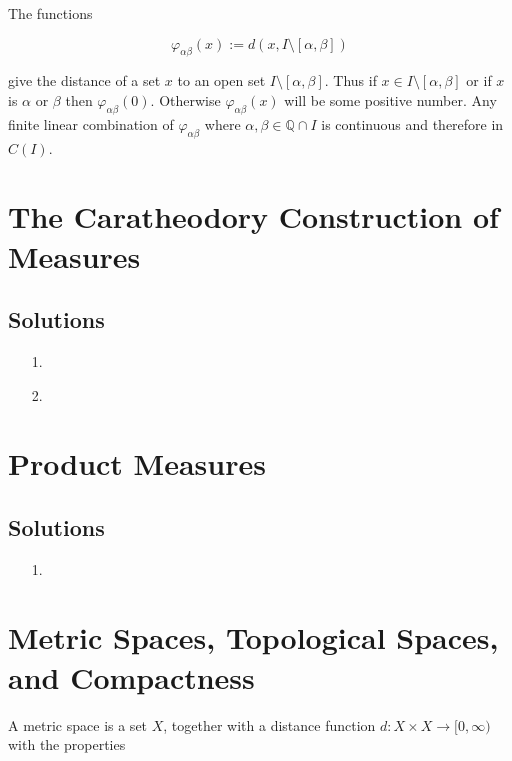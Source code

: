 \documentclass[oneside]{book}
\begin{document}
\begin{enumerate}
The functions

\begin{equation}
\varphi_{\alpha \beta}(x) := d(x, I \setminus [\alpha, \beta])
\end{equation} 

give the distance of a set $x$ to an open set $I \setminus [\alpha,\beta]$. Thus if $x \in I \setminus [\alpha,\beta]$ or if $x$ is $\alpha$ or $\beta$ then $\varphi_{\alpha \beta}(0)$. Otherwise $\varphi_{\alpha \beta}(x)$ will be some positive number. Any finite linear combination of $\varphi_{\alpha \beta}$ where $\alpha,\beta \in \mathbb{Q} \cap I$ is continuous and therefore in $C(I)$.


\end{enumerate}

\chapter{The Caratheodory Construction of Measures}

\section*{Solutions}
\begin{enumerate}
\item[1.]

\item[2.]

\end{enumerate}

\chapter{Product Measures}

\section*{Solutions}
\begin{enumerate}
\item[1.]

\end{enumerate}

\appendix
\chapter{Metric Spaces, Topological Spaces, and Compactness}
A metric space is a set $X$, together with a distance function $d: X \times X \to [0,\infty)$ with the properties
\end{document}
